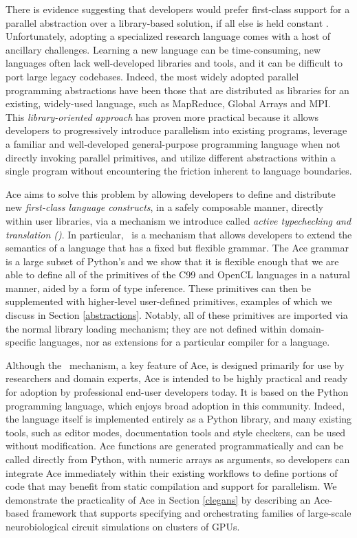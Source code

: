 \documentclass[10pt, conference, compsocconf]{IEEEtran}
\begin{document}
There is evidence suggesting that developers would prefer first-class support for a parallel abstraction over a library-based solution, if all else is held constant \cite{ppfirstclass}. Unfortunately, adopting a specialized research language comes with a host of ancillary challenges. Learning a new language can be time-consuming, new languages often lack well-developed libraries and tools, and it can be difficult to port large legacy codebases. Indeed, the most widely adopted parallel programming abstractions have been those that are distributed as libraries for an existing, widely-used language, such as MapReduce, Global Arrays and MPI. This {\em library-oriented approach} has proven more practical because it allows developers to progressively introduce parallelism into existing programs, leverage a familiar and well-developed general-purpose programming language when not directly invoking parallel primitives, and utilize different abstractions within a single program without encountering the friction inherent to language boundaries. 

Ace aims to solve this problem by allowing developers to define and distribute new {\em first-class language constructs}, in a safely composable manner, directly within user libraries, via a mechanism we introduce called {\em active typechecking and translation (\ATT)}. In particular, \ATT~is a mechanism that allows developers to  extend the semantics of a language that has a fixed but flexible grammar. The Ace grammar is a large subset of Python's  and we show that it is flexible enough that we are able to define all of the primitives of the C99 and OpenCL languages in a natural manner, aided by a form of type inference. These primitives can then be supplemented with higher-level user-defined primitives, examples of which we discuss in Section \ref{abstractions}. Notably, all of these primitives are imported via the normal library loading mechanism; they are not defined within domain-specific languages, nor as extensions for a particular compiler for a language.

Although the \ATT~mechanism, a key feature of Ace, is designed primarily for use by researchers and domain experts, Ace is intended to be highly practical and ready for adoption by professional end-user developers today. It is based on the Python programming language, which enjoys broad adoption in this community. Indeed, the language itself is implemented entirely as a Python library, and many existing tools, such as editor modes, documentation tools and style checkers, can be used without modification.
Ace functions are generated programmatically and can be called directly from Python, with numeric arrays as arguments, so developers can integrate Ace immediately within their existing workflows to define portions of code that may benefit from static compilation and support for parallelism.
We demonstrate the practicality of Ace in Section \ref{clegans} by describing an Ace-based framework that supports specifying and orchestrating families of large-scale neurobiological circuit simulations on clusters of GPUs.
\end{document}
